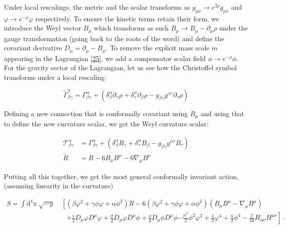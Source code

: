 \documentclass[aps,prd,reprint,preprintnumbers,showpacs,floatfix,nofootinbib,superscript address]{revtex4-2}
\begin{document}
Under local rescalings, the metric and the scalar transforms as $g_{\mu\nu} \rightarrow e^{2\rho} g_{\mu\nu} $ and  $\varphi \rightarrow e^{-\rho}\varphi$ respectively. To ensure the kinetic terms retain their form, we introduce the Weyl vector $B_\mu$ which transforms as such $B_{\mu} \rightarrow B_\mu - \partial_\mu \rho$ under the gauge transformation (going back to the roots of the word) and define the covariant derivative $D_\mu = \partial_\mu - B_\mu$. To remove the explicit mass scale $m$ appearing in the Lagrangian \ref{25}, we add a compensator scalar field $\phi \rightarrow e^{-\rho}\phi$. For the gravity sector of the Lagrangian, let us see how the Christoffel symbol transforms under a local rescaling:

\begin{equation}
    \tilde{\Gamma}^{\alpha}_{\beta \gamma} = \Gamma^{\alpha}_{\beta \gamma} +(\delta^{\alpha}_{\beta} \partial_\gamma \rho + \delta^{\alpha}_{\gamma} \partial_{\beta} \rho - g_{\beta \gamma}g^{\alpha \tau}\partial_{\tau}\rho)
\end{equation}

Defining a new connection that is conformally covariant using $B_\mu$ and using that to define the new curvature scalar, we get the Weyl curvature scalar:

\begin{align}
    \mathcal{T}^{\alpha}_{\beta \gamma} &= \Gamma^{\alpha}_{\beta \gamma} + (\delta^{\alpha}_{\beta} B_{\gamma} + \delta^{\alpha}_{\gamma} B_{\beta} - g_{\beta \gamma}g^{\alpha \tau}B_{\tau}) \nonumber \\
    \tilde{R} &= R - 6 B_{\mu} B^{\mu} - 6 \nabla_\mu B^\mu
\end{align}

Putting all this together, we get the most general conformally invariant action, (assuming linearity in the curvature)

\begin{widetext}
\begin{subequations} \label{28a}
\begin{align}
    S =\int \text{d}^4\text{x} \; \sqrt{-g} &\; \left[ ( \beta \varphi^2 + \gamma \phi \varphi +\alpha \phi^2) R - 6( \beta \varphi^2 + \gamma \phi \varphi +\alpha \phi^2) (B_{\mu} B^{\mu} - \nabla_\mu B^\mu) \right. \nonumber \\
    &\quad \left. +\frac{\epsilon}{2} D_{\mu}\varphi D^{\mu}\varphi + \frac{\sigma}{2} D_{\mu}\varphi D^{\mu}\phi + \frac{\nu}{2} D_{\mu}\phi D^{\mu}\phi \right. \nonumber\left. - \frac{\mu^2}{2} \phi^2 \varphi^2 + \frac{\lambda}{2} \varphi^4 + \frac{\kappa}{2} \phi^4 - \frac{\xi}{16} H_{\mu\nu}H^{\mu\nu} \right] \,.\label{28a} 
\end{align}
\end{subequations}
\end{widetext}
\end{document}
